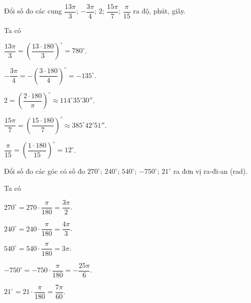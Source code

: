 \begin{bt}%
	Đổi số đo các cung $\dfrac{13\pi}{3}$; $-\dfrac{3\pi}{4}$; $2$; $\dfrac{15\pi}{7}$; $\dfrac{\pi}{15}$ ra độ, phút, giây.
	\loigiai
	{
		Ta có
		\begin{listEX}[3]
			\item $\dfrac{13\pi}{3} = \left(\dfrac{13\cdot 180}{3}\right)^\circ = 780^\circ$.
			\item $-\dfrac{3\pi}{4} = -\left(\dfrac{3\cdot 180}{4}\right)^\circ = -135^\circ$.
			\item $2 = \left(\dfrac{2\cdot 180}{\pi}\right)^\circ \approx 114^\circ 	35' 30''$.
			\item $\dfrac{15\pi}{7} = \left(\dfrac{15\cdot 180}{7}\right)^\circ \approx 385^\circ 42'51''$.
			\item $\dfrac{\pi}{15} = \left(\dfrac{1\cdot 180}{15}\right)^\circ = 12^\circ$.
		\end{listEX}
	}
\end{bt}

\begin{bt}%
	Đổi số đo các góc có số đo $270^\circ$; $240^\circ$; $540^\circ$; $-750^\circ$; $21^\circ$ ra đơn vị ra-đi-an (rad).
	\loigiai
	{
		Ta có
		\begin{listEX}[3]
			\item $270^\circ = 270\cdot \dfrac{\pi}{180} = \dfrac{3\pi}{2}$.
			\item $240^\circ = 240\cdot \dfrac{\pi}{180} = \dfrac{4\pi}{3}$.
			\item $540^\circ = 540\cdot \dfrac{\pi}{180} = 3\pi$.
			\item $-750^\circ = -750\cdot \dfrac{\pi}{180} = -\dfrac{25\pi}{6}$.
			\item $21^\circ = 21\cdot \dfrac{\pi}{180} = \dfrac{7\pi}{60}$.
		\end{listEX}
	}
\end{bt}


